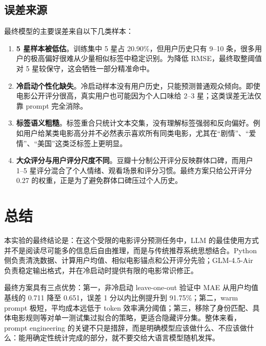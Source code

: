\documentclass[UTF8,a4paper,10pt,fontset=none]{ctexart}
\begin{document}
\subsection{误差来源}

最终模型的主要误差来自以下几类样本：

\begin{enumerate}
    \item \textbf{5 星样本被低估}。训练集中 5 星占 20.90\%，但用户历史只有 9--10 条，很多用户的极高偏好很难从少量相似标签中稳定识别。为降低 RMSE，最终取整阈值对 5 星较保守，这会牺牲一部分精准命中。
    \item \textbf{冷启动个性化缺失}。冷启动样本没有用户历史，只能预测普通观众倾向。即使电影公开评分很高，真实用户也可能因为个人口味给 2--3 星；这类误差无法仅靠 prompt 完全消除。
    \item \textbf{标签语义粗糙}。标签重合只统计文本交集，没有理解标签强弱和反向偏好。例如用户给某类电影高分并不必然表示喜欢所有同类电影，尤其在``剧情''、``爱情''、``美国''这类泛标签上更明显。
    \item \textbf{大众评分与用户评分尺度不同}。豆瓣十分制公开评分反映群体口碑，而用户 1--5 星评分混合了个人情绪、观看场景和评分习惯。最终方案只给公开评分 0.27 的权重，正是为了避免群体口碑压过个人历史。
\end{enumerate}

\section{总结}

本实验的最终结论是：在这个受限的电影评分预测任务中，LLM 的最佳使用方式并不是阅读尽可能多的信息后自由推理，而是与传统推荐系统思想结合。Python 侧负责清洗数据、计算用户均值、相似电影锚点和公开评分先验；GLM-4.5-Air 负责稳定输出格式，并在冷启动时提供有限的电影常识修正。

最终方案具有三点优势：第一，非冷启动 leave-one-out 验证中 MAE 从用户均值基线的 0.711 降至 0.651，误差 1 分以内比例提升到 91.75\%；第二，warm prompt 极短，平均成本远低于 token 效率满分阈值；第三，移除了身份匹配、具体电影规则等对单一测试集过拟合的策略，更适合隐藏评分集。整体来看，prompt engineering 的关键不只是措辞，而是明确模型应该做什么、不应该做什么：能用确定性统计完成的部分，就不要交给大语言模型随机发挥。
\end{document}
